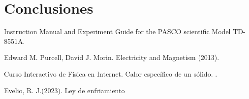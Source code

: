 \documentclass{article}
\begin{document}
\section{Conclusiones}

\begin{thebibliography}{X}

 Instruction Manual and Experiment Guide for the PASCO scientific Model TD-8551A. 

 Edward M. Purcell, David J. Morin. Electricity and Magnetism (2013).

 Curso Interactivo de Física en Internet. Calor específico de un sólido. . 

 Evelio, R. J.(2023). Ley de enfriamiento

\end{thebibliography}
\end{document}
